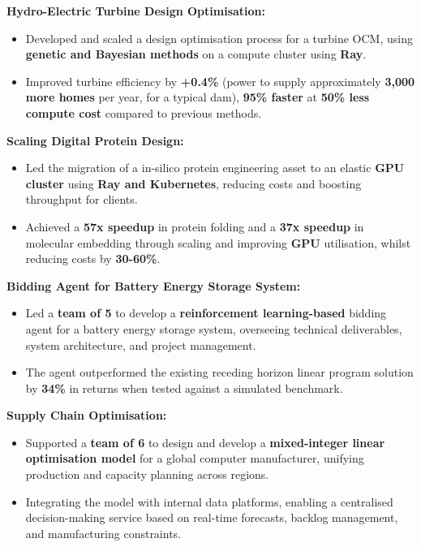\documentclass[a4paper]{deedy-resume} %
\begin{document}
\begin{multicols}{2}
    \vspace{0.1cm}
    \textbf{Hydro-Electric Turbine Design Optimisation:}
    \begin{itemize}
        \item Developed and scaled a design optimisation process for a turbine OCM, using \textbf{genetic and Bayesian methods} on a compute cluster using \textbf{Ray}.
        \item Improved turbine efficiency by \textbf{+0.4\%} (power to supply approximately \textbf{3,000 more homes} per year, for a typical dam), \textbf{95\% faster} at \textbf{50\% less compute cost} compared to previous methods.
    \end{itemize}

    \vspace{0.2cm}
    \textbf{Scaling Digital Protein Design:}
    \begin{itemize}
        \item Led the migration of a in-silico protein engineering asset to an elastic \textbf{GPU cluster} using \textbf{Ray and Kubernetes}, reducing costs and boosting throughput for clients.
        \item Achieved a \textbf{57x speedup} in protein folding and a \textbf{37x speedup} in molecular embedding through scaling and improving \textbf{GPU} utilisation, whilst reducing costs by \textbf{30-60\%}.
    \end{itemize}


    \columnbreak

    \vspace{0.1cm}
    \textbf{Bidding Agent for Battery Energy Storage System:}
    \begin{itemize}
        \item Led a \textbf{team of 5} to develop a \textbf{reinforcement learning-based} bidding agent for a battery energy storage system, 
        overseeing technical deliverables, system architecture, and project management.
        \item The agent outperformed the existing receding horizon linear program solution by \textbf{34\%} in returns when tested against a simulated benchmark.
    \end{itemize}

    \vspace{0.2cm}
    \textbf{Supply Chain Optimisation:}
    \begin{itemize}
        \item Supported a \textbf{team of 6} to design and develop a \textbf{mixed-integer linear optimisation model} for a global computer manufacturer, unifying production and capacity planning across regions.
        \item Integrating the model with internal data platforms, enabling a centralised decision-making service based on real-time forecasts, backlog management, and manufacturing constraints.
    \end{itemize}

\end{multicols}
\end{document}
